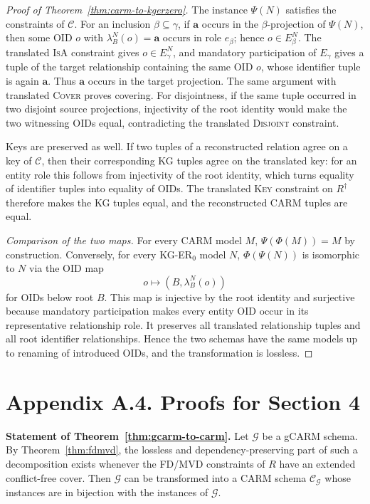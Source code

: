 \documentclass[10pt]{article}
\begin{document}
\begin{proof}[Proof of Theorem~\ref{thm:carm-to-kgerzero}]
The instance $\Psi(N)$ satisfies the constraints of $\mathcal C$.  For
an inclusion $\beta\subseteq\gamma$, if $\mathbf a$ occurs in the
$\beta$-projection of $\Psi(N)$, then some OID $o$ with
$\lambda_B^N(o)=\mathbf a$ occurs in role $e_\beta$; hence
$o\in E_\beta^N$.  The translated \textsc{IsA} constraint gives
$o\in E_\gamma^N$, and mandatory participation of $E_\gamma$ gives a
tuple of the target relationship containing the same OID $o$, whose
identifier tuple is again $\mathbf a$.  Thus $\mathbf a$ occurs in the
target projection.  The same argument with translated \textsc{Cover}
proves covering.  For disjointness, if the same tuple occurred in two
disjoint source projections, injectivity of the root identity would make
the two witnessing OIDs equal, contradicting the translated
\textsc{Disjoint} constraint.

Keys are preserved as well.  If two tuples of a reconstructed relation
agree on a key of $\mathcal C$, then their corresponding KG tuples agree
on the translated key: for an entity role this follows from injectivity
of the root identity, which turns equality of identifier tuples into
equality of OIDs.  The translated \textsc{Key} constraint on
$R^\dagger$ therefore makes the KG tuples equal, and the reconstructed
CARM tuples are equal.

\emph{Comparison of the two maps.}
For every CARM model $M$, $\Psi(\Phi(M))=M$ by construction.  Conversely,
for every KG-ER$_0$ model $N$, $\Phi(\Psi(N))$ is isomorphic to $N$ via
the OID map
\[
  o\mapsto (B,\lambda_B^N(o))
\]
for OIDs below root $B$.  This map is injective by the root identity and
surjective because mandatory participation makes every entity OID occur
in its representative relationship role.  It preserves all translated
relationship tuples and all root identifier relationships.  Hence the
two schemas have the same models up to renaming of introduced OIDs, and
the transformation is lossless.
\end{proof}

\newpage
\section*{Appendix A.4. Proofs for Section 4}

\noindent\textbf{Statement of Theorem~\ref{thm:gcarm-to-carm}.}
Let $\mathcal G$ be a \textsf{gCARM} schema. By
Theorem~\ref{thm:fdmvd}, the lossless and dependency-preserving part of
such a decomposition exists whenever the FD/MVD constraints of $R$ have
an extended conflict-free cover.  Then $\mathcal G$ can be transformed
into a \textsf{CARM} schema $\mathcal C_{\mathcal G}$ whose instances
are in bijection with the instances of $\mathcal G$.
\end{document}
